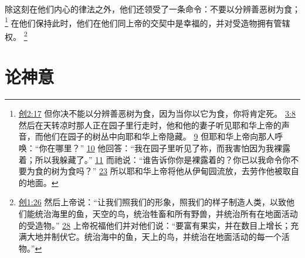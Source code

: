 \documentclass[12pt, a4paper, oneside]{ctexart}
\begin{document}
	除这刻在他们内心的律法之外，他们还领受了一条命令：不要以分辨善恶树为食；
	\footnote {
		\href{https://biblehub.com/genesis/2-17.htm}{创2:17} 但你决不能以分辨善恶树为食，因为当你以它为食，你将肯定死。
		\href{https://biblehub.com/genesis/3-8.htm}{3:8} 然后在天转凉时那人正在园子里行走时，他和他的妻子听见耶和华上帝的声音，而他们在园子的树丛中向耶和华上帝隐藏。
		\href{https://biblehub.com/genesis/3-9.htm}{9} 但耶和华上帝向那人呼唤：“你在哪里？”
		\href{https://biblehub.com/genesis/3-10.htm}{10} 他回答：“我在园子里听见了祢，而我害怕因为我裸露着；所以我躲藏了。”
		\href{https://biblehub.com/genesis/3-11.htm}{11} 而祂说：“谁告诉你你是裸露着的？你已以我命令你不要为食的树为食吗？”
		\href{https://biblehub.com/genesis/3-23.htm}{23} 所以耶和华上帝将他从伊甸园流放，去劳作他被取自的地面。
	}
	在他们保持此时，他们在他们同上帝的交契中是幸福的，并对受造物拥有管辖权。
	\footnote {
		\href{https://biblehub.com/genesis/1-26.htm}{创1:26} 然后上帝说：“让我们照我们的形象，照我们的样子制造人类，以致他们能统治海里的鱼，天空的鸟，统治牲畜和所有野兽，并统治所有在地面活动的受造物。”
		\href{https://biblehub.com/genesis/1-28.htm}{28} 上帝祝福他们并对他们说：“要富有果实，并在数目上增长；充满大地并制伏它。统治海中的鱼，天上的鸟，并统治在地面活动的每一个活物。”
	}

\section{论神意}
\end{document}
